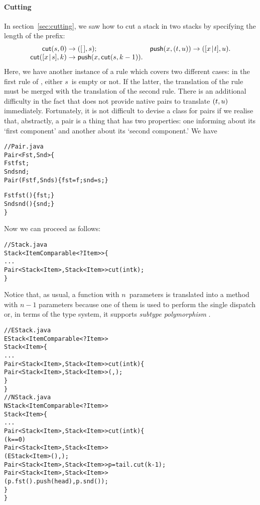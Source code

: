 \paragraph{Cutting}

In section~\vref{sec:cutting}, we saw how to cut a stack in two stacks
by specifying the length of the prefix:
\begin{equation*}
\begin{array}{@{}r@{\;}l@{\;}lr@{\;}l@{\;}l@{}}
\fun{cut}(s,0) & \rightarrow & \pair{\el}{s};
& \fun{push}(x,\pair{t}{u}) & \rightarrow & \pair{\cons{x}{t}}{u}.\\
\fun{cut}(\cons{x}{s},k) & \rightarrow
& \fun{push}(x,\fun{cut}(s,k-1)).
\end{array}
\end{equation*}
Here, we have another instance of a rule which covers two different
cases: in the first rule of , either \(s\)~is empty or
not. If the latter, the translation of the rule must be merged with
the translation of the second rule. There is an additional difficulty
in the fact that \Java does not provide native pairs to translate
\(({t},{u})\) immediately. Fortunately, it is not difficult to
devise a class for pairs if we realise that, abstractly, a pair is a
thing that has two properties: one informing about its `first
component' and another about its `second component.' We have
\begin{alltt}
// Pair.java
\public \class Pair<Fst,Snd> \{
  \protectedX \final Fst fst;
  \protectedX \final Snd snd;
  \public Pair(\final Fst f, \final Snd s) \{fst = f; snd = s;\}

  \public Fst fst() \{ \return fst; \}
  \public Snd snd() \{ \return snd; \}
\}
\end{alltt}
Now we can proceed as follows:
\begin{alltt}
// Stack.java
\public \abstractX
\class Stack<Item \extends Comparable<? \super Item>> \{
  ...
  \public \abstractX
  Pair<Stack<Item>,Stack<Item>> cut(\final int k);
\}
\end{alltt}
Notice that, as usual, a function with \(n\)~parameters is translated
into a method with \(n-1\) parameters because one of them is used to
perform the single dispatch or, in terms of the type system, it
supports \emph{subtype polymorphism} \citep{Pierce_2002}.
\begin{alltt}
// EStack.java
\public \class EStack<Item \extends Comparable<? \super Item>>
       \extends Stack<Item> \{
  ...
  \public Pair<Stack<Item>,Stack<Item>> cut(\final int k) \{
    \return \new Pair<Stack<Item>,Stack<Item>>(\this,\this);
  \}
\}
// NStack.java
\public \class NStack<Item \extends Comparable<? \super Item>>
       \extends Stack<Item> \{
  ...
  \public Pair<Stack<Item>,Stack<Item>> cut(\final int k) \{
    \ifX (k == 0)
       \return \new Pair<Stack<Item>,Stack<Item>>
                      (\new EStack<Item>(),\this);
    Pair<Stack<Item>,Stack<Item>> p = tail.cut(k-1);
    \return \new Pair<Stack<Item>,Stack<Item>>
                   (p.fst().push(head),p.snd());
  \}
\}
\end{alltt}
